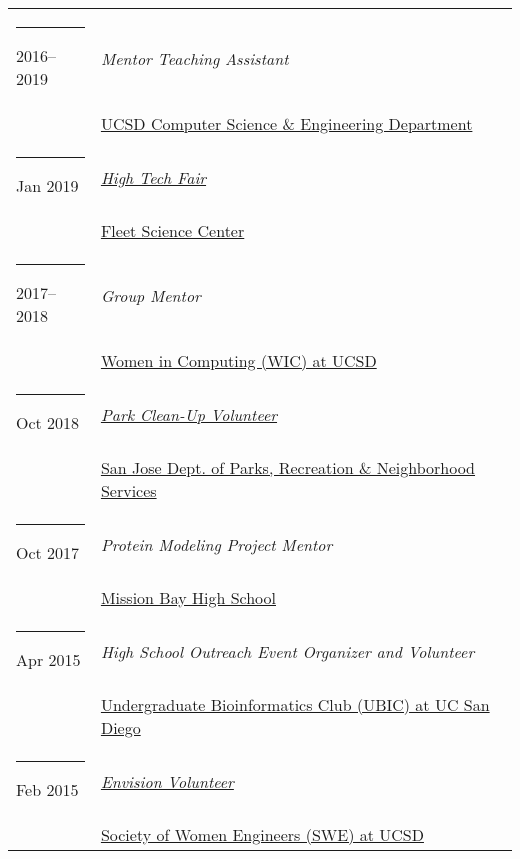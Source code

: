 \documentclass[margin,line]{res}
\begin{document}
\begin{resume}
\begin{longtable}{@{}p{0.7in}p{4in}}
\hspace*{-4mm} \rule{-1mm}{5mm} 2016--2019 & \textit{Mentor Teaching Assistant}\\*
\hspace*{-4mm} & \hspace{4mm} \href{https://cse.ucsd.edu/}{UCSD Computer Science \& Engineering Department}\\
\hspace*{-4mm} \rule{-1mm}{5mm} Jan 2019 & \href{https://www.rhfleet.org/events/high-tech-fair}{\textit{High Tech Fair}}\\*
\hspace*{-4mm} & \hspace{4mm} \href{https://www.rhfleet.org/}{Fleet Science Center}\\
\hspace*{-4mm} \rule{-1mm}{5mm} 2017--2018 & \textit{Group Mentor}\\*
\hspace*{-4mm} & \hspace{4mm} \href{http://wic.ucsd.edu/}{Women in Computing (WIC) at UCSD}\\
\hspace*{-4mm} \rule{-1mm}{5mm} Oct 2018 & \href{http://sanjoseca.gov/DocumentCenter/View/77567}{\textit{Park Clean-Up Volunteer}}\\*
\hspace*{-4mm} & \hspace{4mm} \href{http://www.sanjoseca.gov/index.aspx?NID=204}{San Jose Dept. of Parks, Recreation \& Neighborhood Services}\\
\hspace*{-4mm} \rule{-1mm}{5mm} Oct 2017 & \textit{Protein Modeling Project Mentor}\\*
\hspace*{-4mm} & \hspace{4mm} \href{https://www.sandiegounified.org/schools/mission-bay}{Mission Bay High School}\\
\hspace*{-4mm} \rule{-1mm}{5mm} Apr 2015 & \textit{High School Outreach Event Organizer and Volunteer}\\*
\hspace*{-4mm} & \hspace{4mm} \href{http://ubicucsd.github.io/}{Undergraduate Bioinformatics Club (UBIC) at UC San Diego}\\
\hspace*{-4mm} \rule{-1mm}{5mm} Feb 2015 & \href{http://ucsdenvision.wixsite.com/envision}{\textit{Envision Volunteer}}\\*
\hspace*{-4mm} & \hspace{4mm} \href{http://swe.ucsd.edu/}{Society of Women Engineers (SWE) at UCSD}\\
\end{longtable}


\end{resume}
\end{document}
